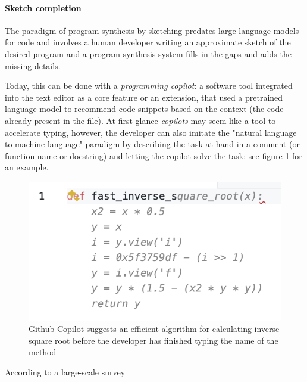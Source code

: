 
\paragraph{Sketch completion}

The paradigm of program synthesis by sketching predates large language models for code \cite{solar-lezamaProgramSynthesisSketching2008} and involves a human developer writing an approximate sketch of the desired program and a program synthesis system fills in the gaps and adds the missing details.

Today, this can be done with a \emph{programming copilot}: a software tool integrated into the text editor as a core feature or an extension, that used a pretrained language model to recommend code snippets based on the context (the code already present in the file).
At first glance \emph{copilots} may seem like a tool to accelerate typing, however, the developer can also imitate the "natural language to machine language" paradigm by describing the task at hand in a comment (or function name or docstring) and letting the copilot solve the task: see figure \ref{fig:fastinversesqrt} for an example.

\begin{figure}
    \centering
    \includegraphics{images/fastinversesqrt.png}
    \caption{Github Copilot \cite{dakhelGithubCopilotAi2023, nguyenEmpiricalEvaluationGitHub2022, wermelingerUsingGithubCopilot2023} suggests an efficient algorithm for calculating inverse square root \cite{lomontFastInverseSquare2003} before the developer has finished typing the name of the method}
    \label{fig:fastinversesqrt}
\end{figure}

According to a large-scale survey \cite{liangLargeScaleSurveyUsability2024} 


